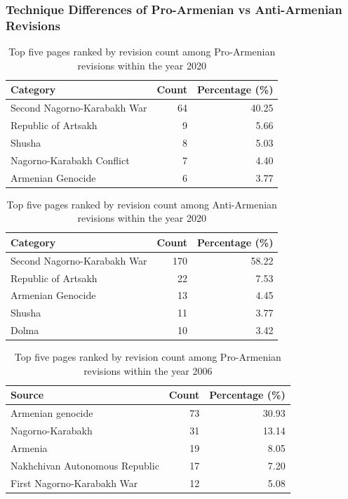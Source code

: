 \documentclass[11pt, a4paper, twoside, openright]{article} %
\begin{document}
\subsubsection{Technique Differences of Pro-Armenian vs Anti-Armenian Revisions}

\begin{table}[h!]
\centering
\begin{tabular}{@{}lrr@{}}  %
\toprule
\textbf{Category} & \textbf{Count} & \textbf{Percentage (\%)} \\
\midrule
Second Nagorno-Karabakh War & 64 & 40.25 \\
Republic of Artsakh & 9 & 5.66 \\
Shusha & 8 & 5.03 \\
Nagorno-Karabakh Conflict & 7 & 4.40 \\
Armenian Genocide & 6 & 3.77 \\
\bottomrule
\end{tabular}
\caption{Top five pages ranked by revision count among Pro-Armenian revisions within the year 2020}
\label{tab:pro-2020}
\end{table}

\begin{table}[h!]
\centering
\begin{tabular}{@{}lrr@{}}  %
\toprule
\textbf{Category} & \textbf{Count} & \textbf{Percentage (\%)} \\
\midrule
Second Nagorno-Karabakh War & 170 & 58.22 \\
Republic of Artsakh & 22 & 7.53 \\
Armenian Genocide & 13 & 4.45 \\
Shusha & 11 & 3.77 \\
Dolma & 10 & 3.42 \\
\bottomrule
\end{tabular}
\caption{Top five pages ranked by revision count among Anti-Armenian revisions within the year 2020}
\label{tab:anti-2020}
\end{table}

\begin{table}[h!]
\centering
\begin{tabular}{@{}lrr@{}}  %
\toprule
\textbf{Source} & \textbf{Count} & \textbf{Percentage (\%)} \\
\midrule
Armenian genocide & 73 & 30.93 \\
Nagorno-Karabakh & 31 & 13.14 \\
Armenia & 19 & 8.05 \\
Nakhchivan Autonomous Republic & 17 & 7.20 \\
First Nagorno-Karabakh War & 12 & 5.08 \\
\bottomrule
\end{tabular}
\caption{Top five pages ranked by revision count among Pro-Armenian revisions within the year 2006}
\label{tab:pro-2006}
\end{table}
\end{document}
